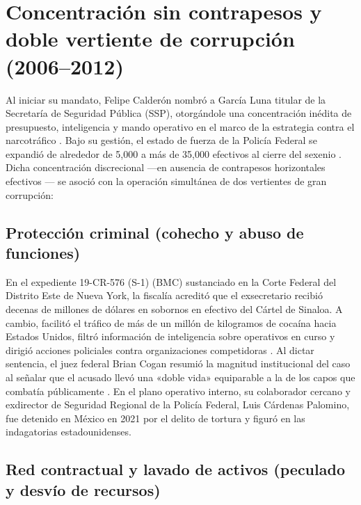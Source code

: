 \section{Concentración sin contrapesos y doble vertiente de corrupción (2006--2012)}

Al iniciar su mandato, Felipe Calderón nombró a García Luna titular de la Secretaría de Seguridad Pública (SSP), otorgándole una concentración inédita de presupuesto, inteligencia y mando operativo en el marco de la estrategia contra el narcotráfico \citep{astorga2015}. Bajo su gestión, el estado de fuerza de la Policía Federal se expandió de alrededor de 5,000 a más de 35,000 efectivos al cierre del sexenio \citep{pastrana2024}. Dicha concentración discrecional ---en ausencia de contrapesos horizontales efectivos \citep{lopezayllon2009,zaid2019}--- se asoció con la operación simultánea de dos vertientes de gran corrupción:

\subsection{Protección criminal (cohecho y abuso de funciones)}

En el expediente 19-CR-576 (S-1) (BMC) sustanciado en la Corte Federal del Distrito Este de Nueva York, la fiscalía acreditó que el exsecretario recibió decenas de millones de dólares en sobornos en efectivo del Cártel de Sinaloa. A cambio, facilitó el tráfico de más de un millón de kilogramos de cocaína hacia Estados Unidos, filtró información de inteligencia sobre operativos en curso y dirigió acciones policiales contra organizaciones competidoras \citep{doj2024garcialuna,insightcrime2023}. Al dictar sentencia, el juez federal Brian Cogan resumió la magnitud institucional del caso al señalar que el acusado llevó una «doble vida» equiparable a la de los capos que combatía públicamente \citep{pastrana2024}. En el plano operativo interno, su colaborador cercano y exdirector de Seguridad Regional de la Policía Federal, Luis Cárdenas Palomino, fue detenido en México en 2021 por el delito de tortura y figuró en las indagatorias estadounidenses.

\subsection{Red contractual y lavado de activos (peculado y desvío de recursos)}

